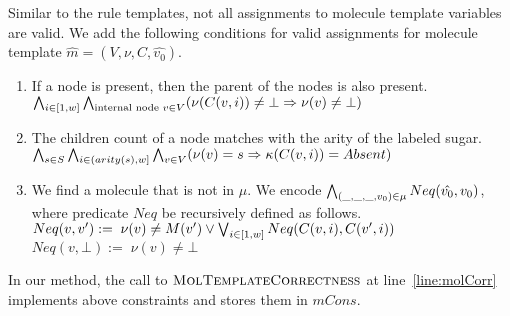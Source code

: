 %
Similar to the rule templates, not all assignments to molecule template variables
are valid.
We add the following conditions for
valid assignments for molecule template $\hat{m} = (V, \nu, C, \hat{v_0})$.
\begin{enumerate}
\item If a node is present, then the parent of the nodes is also present.\\
  $
  \bigwedge_{i\in[1,w]}\bigwedge_{{\text{internal node } v \in V}} (\nu(C(v,i) ) \neq \bot \Rightarrow \nu( v ) \neq \bot )  
  $
\item The children count of a node matches with the arity of the labeled sugar.\\
  $
  \bigwedge_{s \in S} \bigwedge_{i \in (arity(s),w] }\bigwedge_{v \in V} (\nu(v) = s \Rightarrow \kappa( C(v,i) ) = Absent )
  $
\item We find a molecule that is not in $\mu$.
  We encode $\bigwedge_{{(\_,\_,\_, v_0)\in \mu}}  Neq(\hat{v_0},v_0)$, where
   predicate $Neq$ be recursively defined as follows.\\
  $Neq(v, v') :=\; \nu(v) \neq M(v') \lor
  \bigvee_{{i \in [1,w]}} Neq( C(v,i), C(v',i ) )$\\
  $Neq(v,\bot) :=\;  \nu(v) \neq \bot$
\end{enumerate}
%
In our method, the call to $\textsc{MolTemplateCorrectness}$ at
line~\ref{line:molCorr} implements above constraints and stores them in
$mCons$. 


